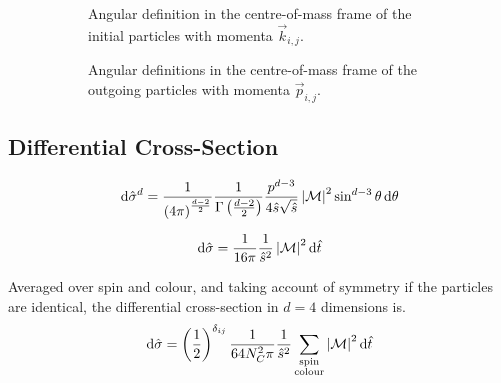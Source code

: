 \documentclass[../main.tex]{subfiles}
\begin{document}
            \begin{figure}
                \centering
                \begin{subfigure}{.49\textwidth}
                    \centering
                    \caption{Angular definition in the centre-of-mass frame of the initial particles with momenta \(\vec{k}_{i,j}\).}
                \end{subfigure}
                \hfill
                \begin{subfigure}{.49\textwidth}
                    \centering
                    \caption{Angular definitions in the centre-of-mass frame of the outgoing particles with momenta \(\vec{p}_{i,j}\).}
                \end{subfigure}
                \caption{}
            \end{figure}



        \subsection{Differential Cross-Section}
            \begin{equation}
                \mathrm{d}\hat{\sigma}^d = \frac{1}{\left(4\pi\right)^{\frac{d-2}{2}}} \frac{1}{\Gamma\left(\frac{d-2}{2}\right)} \frac{p^{d-3}}{4\hat{s}\sqrt{\hat{s}}} \left|\mathcal{M}\right|^2 \sin^{d-3}\theta\, \mathrm{d}\theta
            \end{equation}

            \begin{equation}
                \mathrm{d}\hat{\sigma} = \frac{1}{16\pi} \frac{1}{\hat{s}^2} \left|\mathcal{M}\right|^2 \mathrm{d}\hat{t}
            \end{equation}


            Averaged over spin and colour, and taking account of symmetry if the particles are identical, the differential cross-section in \(d=4\) dimensions is.
            \begin{equation}
                \mathrm{d}\hat{\sigma} = \left(\frac{1}{2}\right)^{\delta_{ij}} \frac{1}{64 N_C^2 \pi} \frac{1}{\hat{s}^2} \sum_{\substack{\text{spin}\\\text{colour}}} \left|\mathcal{M}\right|^2 \mathrm{d}\hat{t}
            \end{equation}
\end{document}
